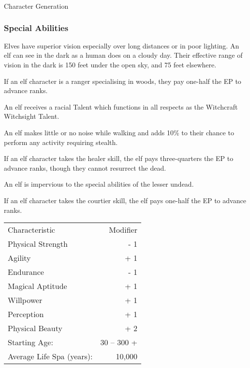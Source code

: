 \begin{Chapter}{Character Generation}
\subsubsection{Special Abilities}

\begin{Enumerate}
\item Elves have superior vision especially over long distances or in
  poor lighting. An elf can see in the dark as a human does on a
  cloudy day. Their effective range of vision in the dark is 150 feet
  under the open sky, and 75 feet elsewhere.

\item If an elf character is a ranger specialising in woods, they pay
  one-half the EP to advance ranks.

\item An elf receives a racial Talent which functions in all respects
  as the Witchcraft Witchsight Talent.

\item An elf makes little or no noise while walking and adds 10\% to
  their chance to perform any activity requiring stealth.

\item If an elf character takes the healer skill, the elf pays
  three-quarters the EP to advance ranks, though they cannot resurrect
  the dead.

\item An elf is impervious to the special abilities of the lesser
  undead.

\item If an elf character takes the courtier skill, the elf pays
  one-half the EP to advance ranks.

\end{Enumerate}
  
\begin{tabularx}{\columnwidth}{Xr}
Characteristic			& Modifier \\
Physical Strength		& - 1 \\
Agility				& + 1 \\
Endurance			& - 1 \\ 
Magical Aptitude		& + 1 \\
Willpower			& + 1 \\
Perception			& + 1 \\
Physical Beauty			& + 2 \\
Starting Age:			& 30 -- 300 + \\
Average Life Spa (years):	& ~ 10,000 \\
\end{tabularx}


\end{Chapter}
